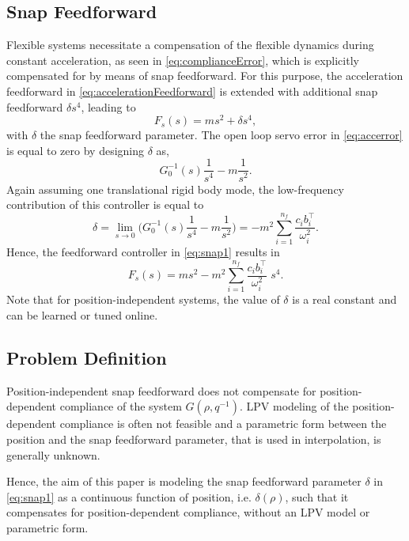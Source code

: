 \documentclass[letterpaper, 10 pt, conference]{ieeeconf}  %
\begin{document}
\subsection{Snap Feedforward}
Flexible systems necessitate a compensation of the flexible dynamics during constant acceleration, as seen in \eqref{eq:complianceError}, which is explicitly compensated for by means of snap feedforward. For this purpose, the acceleration feedforward in \eqref{eq:accelerationFeedforward} is extended with additional snap feedforward $\delta s^4$, leading to
\begin{equation}
	\label{eq:snap1}
	{F}_s(s) = {m}s^2 +\delta s^4,
\end{equation}
with $\delta$ the snap feedforward parameter. The open loop servo error in \eqref{eq:accerror} is equal to zero by designing $\delta$ as,
\begin{equation*}
	G_0^{-1}(s)\frac{1}{s^4}-{m}\frac{1}{s^2}.
\end{equation*}
Again assuming one translational rigid body mode, the low-frequency contribution of this controller is equal to
\begin{equation*}
	\delta = \lim_{s\rightarrow 0}\bigg( {G}_0^{-1}(s)\frac{1}{s^4}-{m}\frac{1}{s^2}\bigg) = -{m}^2\sum_{i=1}^{n_f}\frac{ c_{i} b_i^\top}{\omega_i^2}.
\end{equation*}
Hence, the feedforward controller in \eqref{eq:snap1} results in
\begin{equation}
	{F}_s(s) = {m}s^2-{m}^2\sum_{i=1}^{n_f}\frac{ c_{i} b_i^\top}{\omega_i^2}\; s^4.
\end{equation}
Note that for position-independent systems, the value of $\delta$ is a real constant and can be learned or tuned online.

\subsection{Problem Definition}
Position-independent snap feedforward does not compensate for position-dependent compliance of the system $G(\rho,q^{-1})$. LPV modeling of the position-dependent compliance is often not feasible and a parametric form between the position and the snap feedforward parameter, that is used in interpolation, is generally unknown. \par 
Hence, the aim of this paper is modeling the snap feedforward parameter $\delta$ in \eqref{eq:snap1} as a continuous function of position, i.e. $\delta(\rho)$, such that it compensates for position-dependent compliance, without an LPV model or parametric form.
\end{document}

